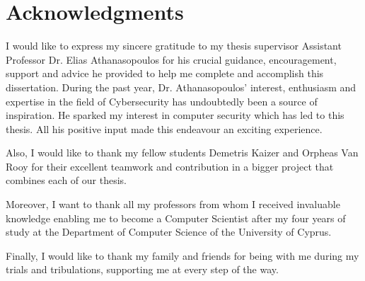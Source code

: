 \section*{\LARGE{Acknowledgments}}

I would like to express my sincere gratitude to my thesis supervisor Assistant Professor Dr. Elias Athanasopoulos for his crucial guidance, encouragement, support and advice he provided to help me complete and accomplish this dissertation. During the past year, Dr. Athanasopoulos' interest, enthusiasm and expertise in the field of Cybersecurity has undoubtedly been a source of inspiration. He sparked my interest in computer security which has led to this thesis. All his positive input made this endeavour an exciting experience. 

Also, I would like to thank my fellow students Demetris Kaizer and Orpheas Van Rooy for their excellent teamwork and contribution in a bigger project that combines each of our thesis.

Moreover, I want to thank all my professors from whom I received invaluable knowledge enabling me to become a Computer Scientist after my four years of study at the Department of Computer Science of the University of Cyprus.

Finally, I would like to thank my family and friends for being with me during my trials and tribulations, supporting me at every step of the way.